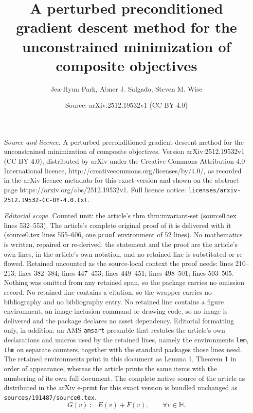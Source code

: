 \documentclass[10pt,a4paper]{amsart}
\title{A perturbed preconditioned gradient descent method for the unconstrained minimization of composite objectives}
\author{Jea-Hyun Park, Abner J. Salgado, Steven M. Wise}
\date{Source: arXiv:2512.19532v1 (CC BY 4.0)}
\newcommand{\HH}{\mathbb{H}}
\begin{document}
\maketitle

\noindent\emph{Source and licence.} A perturbed preconditioned gradient descent method for the unconstrained minimization of composite objectives. Version arXiv:2512.19532v1 (CC BY 4.0), distributed by arXiv under the Creative Commons Attribution 4.0 International licence, http://creativecommons.org/licenses/by/4.0/, as recorded in the arXiv licence metadata for this exact version and shown on the abstract page https://arxiv.org/abs/2512.19532v1. Full licence notice: \texttt{licenses/arxiv-2512.19532-CC-BY-4.0.txt}.\par\smallskip

\noindent\textit{Editorial scope.} Counted unit: the article's thm thm:invariant-set (source0.tex lines 532--553). The article's complete original proof of it is delivered with it (source0.tex lines 555--606, one \texttt{proof} environment of 52 lines). No mathematics is written, repaired or re-derived: the statement and the proof are the article's own lines, in the article's own notation, and no retained line is substituted or re-flowed.  Retained uncounted as the source-local context the proof needs: lines 210--213; lines 382--384; lines 447--453; lines 449--451; lines 498--501; lines 503--505.  Nothing was omitted from any retained span, so the package carries no omission record.  No retained line contains a citation, so the wrapper carries no bibliography and no bibliography entry.  No retained line contains a figure environment, an image-inclusion command or drawing code, so no image is delivered and the package declares no asset dependency.  Editorial formatting only, in addition: an AMS \texttt{amsart} preamble that restates the article's own declarations and macros used by the retained lines, namely the environments \texttt{lem}, \texttt{thm} on separate counters, together with the standard packages those lines need.  The retained environments print in this document as Lemma 1, Theorem 1 in order of appearance, whereas the article prints the same items with the numbering of its own full document.  The complete native source of the article as distributed in the arXiv e-print for this exact version is bundled unchanged as \texttt{sources/191487/source0.tex}.
\begin{equation}
\label{eq:GisComposite}
  G(v) \coloneqq E(v) + F(v), \qquad \forall v \in \HH.
\end{equation}
\end{document}

